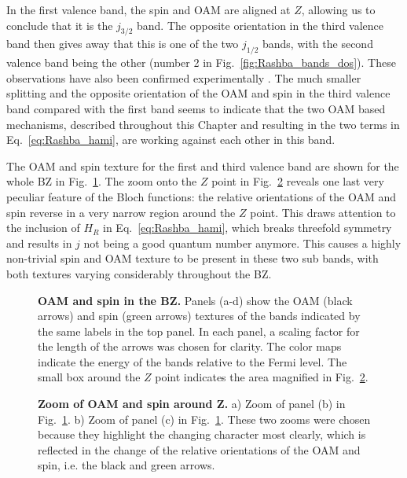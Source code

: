 In the first valence band, the spin and OAM are aligned at $Z$, allowing us to conclude that it is the $j_{3/2}$ band. The opposite orientation in the third valence band then gives away that this is one of the two $j_{1/2}$ bands, with the second valence band being the other (number 2 in Fig.~\ref{fig:Rashba_bands_dos}).
These observations have also been confirmed experimentally \cite{Krempasky2015,Krempasky2020}.
The much smaller splitting and the opposite orientation of the OAM and spin in the third valence band compared with the first band seems to indicate that the two OAM based mechanisms, described throughout this Chapter and resulting in the two terms in Eq.~\eqref{eq:Rashba_hami}, are working against each other in this band.

The OAM and spin texture for the first and third valence band are shown for the whole BZ in Fig.~\ref{fig:Rashba_textures}.
The zoom onto the $Z$ point in Fig.~\ref{fig:Rashba_textures_small} reveals one last very peculiar feature of the Bloch functions: the relative orientations of the OAM and spin reverse in a very narrow region around the $Z$ point.
This draws attention to the inclusion of $H_R$ in Eq.~\eqref{eq:Rashba_hami}, which breaks threefold symmetry and results in $j$ not being a good quantum number anymore. This causes a highly non-trivial spin and OAM texture to be present in these two sub bands, with both textures varying considerably throughout the BZ. 
\begin{figure}
	\centering
  \caption{\label{fig:Rashba_textures}{\bf OAM and spin in the BZ.} Panels (a-d) show the OAM (black arrows) and spin (green arrows) textures of the bands indicated by the same labels in the top panel. In each panel, a scaling factor for the length of the arrows was chosen for clarity. The color maps indicate the energy of the bands relative to the Fermi level. The small box around the $Z$ point indicates the area magnified in Fig.~\ref{fig:Rashba_textures_small}.}
\end{figure}
\begin{figure}
	\centering
  \caption{\label{fig:Rashba_textures_small}{\bf Zoom of OAM and spin around Z.} a) Zoom of panel (b) in Fig.~\ref{fig:Rashba_textures}. b) Zoom of panel (c) in Fig.~\ref{fig:Rashba_textures}.  These two zooms were chosen because they highlight the changing character most clearly, which is reflected in the change of the relative orientations of the OAM and spin, i.e. the black and green arrows.}
\end{figure}

